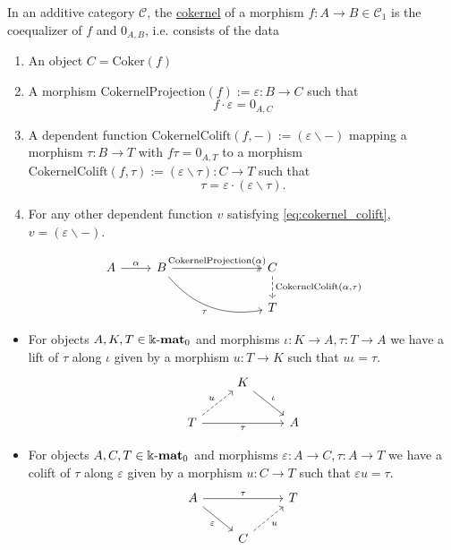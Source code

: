 \begin{definition}[Cokernel]
In an additive category $\mathcal{C}$, the \ul{cokernel} of a morphism $f : A \rightarrow B \in \mathcal{C}_{1}$ is the coequalizer of
$f$ and $0_{A,B}$, i.e. consists of the data
\begin{enumerate}
\renewcommand{\labelenumi}{(\theenumi)}
\item An object $C = \mathrm{Coker}(f)$
\item A morphism $\mathrm{CokernelProjection}(f) := \varepsilon : B \rightarrow C$ such that
\[
f \cdot \varepsilon = 0_{A,C}
\]
\item A dependent function $\mathrm{CokernelColift}(f,-) := ( \varepsilon \backslash -)$ mapping a morphism $\tau : B \rightarrow T$ with
$f \tau  = 0_{A,T}$ to a morphism $\mathrm{CokernelColift}(f,\tau) := ( \varepsilon \backslash \tau) : C \rightarrow T$ such that
\[
\tau =\label{eq:cokernel_colift} \varepsilon \cdot (\varepsilon \backslash \tau).
\]
\item For any other dependent function $v$ satisfying \eqref{eq:cokernel_colift}, $v = ( \varepsilon \backslash - )$.
\end{enumerate}
\[
\begin{tikzcd}
A \arrow[r, "\alpha"] & B \arrow[rrr, "\mathrm{CokernelProjection}(\alpha)", two heads] \arrow[rrrd, "\tau"', bend right] &  &  & C \arrow[d, "{\mathrm{CokernelColift}(\alpha,\tau)}", dashed] \\
                      &                                                                                                   &  &  & T                                                            
\end{tikzcd}
\]
\end{definition}

\begin{definition}
\begin{itemize}
\item For objects $A, K, T \in \Bbbk\textnormal{-}\mathbf{mat}_{0}$ and morphisms $\iota : K \rightarrow A, \tau : T \rightarrow A$ we have a lift of $\tau$ along $\iota$
given by a morphism $u : T \rightarrow K$ such that $u \iota = \tau$.
\[
\begin{tikzcd}
                                              & K \arrow[rd, "\iota"] &   \\
T \arrow[rr, "\tau"'] \arrow[ru, "u", dashed] &                       & A
\end{tikzcd}
\]
\item For objects $A,C,T \in \Bbbk\textnormal{-}\mathbf{mat}_{0}$ and morphisms $\varepsilon : A \rightarrow C, \tau : A \rightarrow T$ we have a colift of $\tau$ along
$\varepsilon$ given by a morphism $u : C \rightarrow T$ such that $\varepsilon u = \tau$.
\[
\begin{tikzcd}
A \arrow[rr, "\tau"] \arrow[rd, "\varepsilon"'] &                            & T \\
                                                & C \arrow[ru, "u"', dashed] &  
\end{tikzcd}
\]
\end{itemize}
\end{definition}

